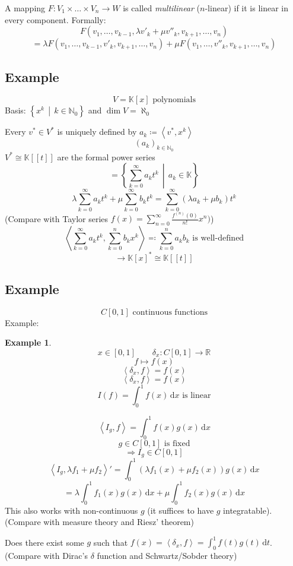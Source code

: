 \documentclass[a4paper,landscape,twocolumn]{article}
\newcommand\setdef[2]{\left\{#1\,\middle|\,#2\right\}}
\newcommand\functional[1]{\left\langle{#1}\right\rangle}
\newtheorem{ex}{Example}
\begin{document}
A mapping $F: V_1 \times \ldots \times V_n \to W$ is called \emph{multilinear} ($n$-linear)
if it is linear in every component. Formally:
\[
  F(v_1, \ldots, v_{k-1}, \lambda v'_k + \mu v''_k, v_{k+1}, \ldots, v_n)
\] \[
    = \lambda F(v_1, \ldots, v_{k-1}, v'_k, v_{k+1}, \ldots, v_n) + \mu F(v_1, \ldots, v''_k, v_{k+1}, \ldots, v_n)
\]

\subsection{Example}
\label{ex-5.28}
%
\[ V = \mathbb K[x] \text{ polynomials} \]
Basis: $\setdef{x^k}{k \in \mathbb N_0}$ and $\dim{V} = \aleph_0$

Every $v^* \in V^*$ is uniquely defined by $a_k \coloneqq \functional{v^*, x^k}$
\[ (a_k)_{k \in \mathbb N_0} \]
$V^* \cong \mathbb K[[t]]$ are the formal power series
\[ = \setdef{\sum_{k=0}^\infty a_k t^k}{a_k \in \mathbb K} \]
\[ \lambda \sum_{k=0}^\infty a_k t^k + \mu \sum_{k=0}^\infty b_k t^k = \sum_{k=0}^\infty (\lambda a_k + \mu b_k) t^k \]
(Compare with Taylor series $f(x) = \sum_{n=0}^\infty \frac{f^{(n)}(0)}{n!} x^n)$)
\[ \functional{\sum_{k=0}^\infty a_k t^k, \sum_{k=0}^n b_k x^k} \eqqcolon \sum_{k=0}^n a_k b_k \text{ is well-defined} \]
\[ \rightarrow \mathbb K[x]^* \cong \mathbb K[[t]] \]

\subsection{Example}
\label{ex-5.29}
\[ C[0,1] \text{ continuous functions} \]
Example:
\begin{ex}
\[ x \in [0,1] \qquad \delta_{x}: C[0,1] \to \mathbb R \]
\[ f \mapsto f(x) \]
\[ \functional{\delta_x, f} = f(x) \]
\[ \functional{\delta_x, f} = f(x) \]
\[ I(f) = \int_0^1 f(x) \, \text{d}x \text{ is linear} \]
\end{ex}

\[ \functional{I_g,f} = \int_0^1 f(x) g(x) \, \text{d}x \]
\[ g \in C[0,1] \text{ is fixed} \]
\[ \Rightarrow I_g \in C[0,1] \]
\[
  \functional{I_g, \lambda f_1 + \mu f_2}' = \int_0^1 (\lambda f_1(x) + \mu f_2(x)) g(x) \,\text{d}x
\] \[
  = \lambda \int_0^1 f_1(x) g(x) \,\text{d}x + \mu \int_0^1 f_2(x) g(x) \,\text{d}x
\]
This also works with non-continuous $g$ (it suffices to have $g$ integratable). (Compare with measure theory and Riesz' theorem)

Does there exist some $g$ such that $f(x) = \functional{\delta_x, f} = \int_0^1 f(t) g(t) \,\text{d}t$.
(Compare with Dirac's $\delta$ function and Schwartz/Sobder theory)
\end{document}
